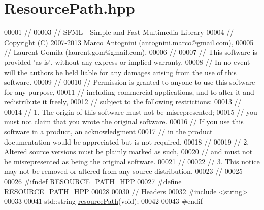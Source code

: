 \hypertarget{_resource_path_8hpp_source}{}\section{Resource\+Path.\+hpp}
\label{_resource_path_8hpp_source}

\begin{DoxyCode}
00001 \textcolor{comment}{//}
00003 \textcolor{comment}{// SFML - Simple and Fast Multimedia Library}
00004 \textcolor{comment}{// Copyright (C) 2007-2013 Marco Antognini (antognini.marco@gmail.com),}
00005 \textcolor{comment}{//                         Laurent Gomila (laurent.gom@gmail.com),}
00006 \textcolor{comment}{//}
00007 \textcolor{comment}{// This software is provided 'as-is', without any express or implied warranty.}
00008 \textcolor{comment}{// In no event will the authors be held liable for any damages arising from the use of this software.}
00009 \textcolor{comment}{//}
00010 \textcolor{comment}{// Permission is granted to anyone to use this software for any purpose,}
00011 \textcolor{comment}{// including commercial applications, and to alter it and redistribute it freely,}
00012 \textcolor{comment}{// subject to the following restrictions:}
00013 \textcolor{comment}{//}
00014 \textcolor{comment}{// 1. The origin of this software must not be misrepresented;}
00015 \textcolor{comment}{//    you must not claim that you wrote the original software.}
00016 \textcolor{comment}{//    If you use this software in a product, an acknowledgment}
00017 \textcolor{comment}{//    in the product documentation would be appreciated but is not required.}
00018 \textcolor{comment}{//}
00019 \textcolor{comment}{// 2. Altered source versions must be plainly marked as such,}
00020 \textcolor{comment}{//    and must not be misrepresented as being the original software.}
00021 \textcolor{comment}{//}
00022 \textcolor{comment}{// 3. This notice may not be removed or altered from any source distribution.}
00023 \textcolor{comment}{//}
00025 \textcolor{comment}{}
00026 \textcolor{preprocessor}{#ifndef RESOURCE\_PATH\_HPP}
00027 \textcolor{preprocessor}{#define RESOURCE\_PATH\_HPP}
00028 
00030 \textcolor{comment}{// Headers}
00032 \textcolor{comment}{}\textcolor{preprocessor}{#include <string>}
00033 
00041 std::string \hyperlink{_resource_path_8hpp_a377b456e3964835648f2d726c2e4f510}{resourcePath}(\textcolor{keywordtype}{void});
00042 
00043 \textcolor{preprocessor}{#endif}
\end{DoxyCode}
